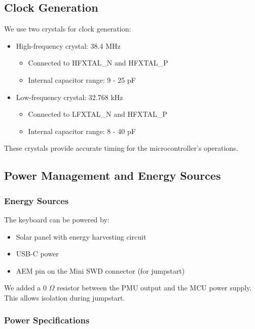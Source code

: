 \documentclass[a4paper,11pt]{article}%
\begin{document}
\subsection{Clock Generation}

We use two crystals for clock generation:

\begin{itemize}
    \item High-frequency crystal: 38.4 MHz
    \begin{itemize}
        \item Connected to HFXTAL\_N and HFXTAL\_P
        \item Internal capacitor range: 9 - 25 pF
    \end{itemize}
    \item Low-frequency crystal: 32.768 kHz
    \begin{itemize}
        \item Connected to LFXTAL\_N and HFXTAL\_P
        \item Internal capacitor range: 8 - 40 pF
    \end{itemize}
\end{itemize}

These crystals provide accurate timing for the microcontroller's operations.

\subsection{Power Management and Energy Sources}

\subsubsection{Energy Sources}

The keyboard can be powered by:

\begin{itemize}
    \item Solar panel with energy harvesting circuit
    \item USB-C power
    \item AEM pin on the Mini SWD connector (for jumpstart)
\end{itemize}

We added a 0 $\Omega$ resistor between the PMU output and the MCU power supply. This allows isolation during jumpstart.

\subsubsection{Power Specifications}
\end{document}
